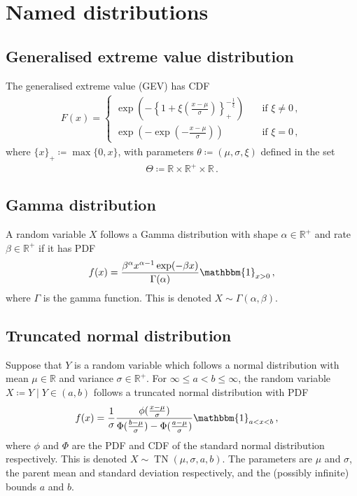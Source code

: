 \documentclass{article}
\newcommand{\R}{\mathbb{R}}
\begin{document}
\section{Named distributions}
\label{section:distributions}
%

%
\subsection{Generalised extreme value distribution}
%

%
The generalised extreme value (GEV) has CDF
%
\begin{align}
	F(x) =
		\begin{cases}
			\exp\left(-\left\{1 + \xi
			\left(\frac{x - \mu}{\sigma}\right)\right\}_+
			^ {-\frac{1}{\xi}}\right)
			&\quad \text{if $\xi \neq 0$} \,,\\
			\exp(-\exp(-\frac{x - \mu}{\sigma}))
			&\quad \text{if $\xi = 0$} \,,
		\end{cases}
	\label{eq:GEV-CDF}
\end{align}
%
where $\{x\}_+ \coloneqq \max\{0, x\}$, with parameters
$\theta \coloneqq (\mu, \sigma, \xi)$ defined in the set
%
\begin{align}
	\Theta \coloneqq \R \times \R^+ \times \R \,.
	\label{eq:Theta}
\end{align}
%
\subsection{Gamma distribution}
%

%
A random variable $X$ follows a Gamma distribution
with shape $\alpha \in \R^+$ and rate $\beta \in \R^+$
if it has PDF
%
\begin{align*}
	f(x) = \frac{\beta ^ \alpha x ^ {\alpha - 1} \exp(-\beta x)}{\Gamma(\alpha)}
	\mathbbm{1}_{x > 0} \,,
\end{align*}
%
where $\Gamma$ is the gamma function.
This is denoted $X \sim \Gamma(\alpha, \beta)$.
%
\subsection{Truncated normal distribution}
%

%
Suppose that $Y$ is a random variable which follows a normal distribution
with mean $\mu \in \R$ and variance $\sigma \in \R^+$.
For $\infty \leq a < b \leq \infty$,
the random variable $X \coloneqq Y \mid Y \in (a, b)$
follows a truncated normal distribution with PDF
%
\begin{align*}
	f(x) &= \frac{1}{\sigma} \frac{\phi(\frac{x - \mu}{\sigma})}
		{\Phi(\frac{b - \mu}{\sigma}) - \Phi(\frac{a - \mu}{\sigma})}
		\mathbbm{1}_{a < x < b} \,,
\end{align*}
%
where $\phi$ and $\Phi$ are the PDF and CDF of the
standard normal distribution respectively.
This is denoted $X \sim \operatorname{TN}(\mu, \sigma, a, b)$.
The parameters are $\mu$ and $\sigma$, the parent mean and standard deviation respectively, and the (possibly infinite) bounds $a$ and $b$.
%
\end{document}
